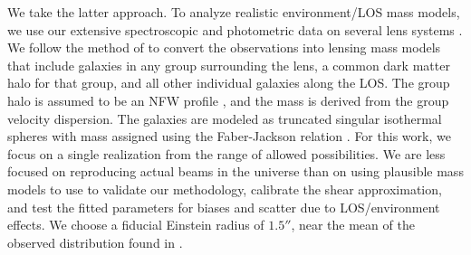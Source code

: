 We take the latter approach. To analyze realistic environment/LOS mass models, we use our extensive spectroscopic and photometric data on several lens systems \citep{Wong11}. We follow the method of \citet{Wong11} to convert the observations into lensing mass models that include galaxies in any group surrounding the lens, a common dark matter halo for that group, and all other individual galaxies along the LOS. The group halo is assumed to be an NFW profile \citep{Navarro96}, and the mass is derived from the group velocity dispersion. The galaxies are modeled as truncated singular isothermal spheres with mass assigned using the Faber-Jackson relation \citep{Faber76}. For this work, we focus on a single realization from the range of allowed possibilities.  We are less focused on reproducing actual beams in the universe than on using plausible mass models to use to validate our methodology, calibrate the shear approximation, and test the fitted parameters for biases and scatter due to LOS/environment effects. We choose a fiducial Einstein radius of $1.5''$, near the mean of the observed distribution found in \citet{Sonnenfeld13}. 
  
  